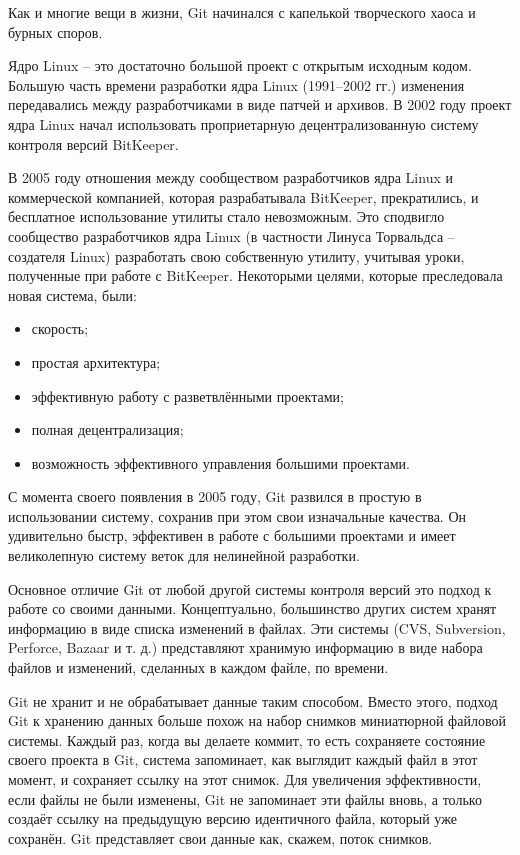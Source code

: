 Как и многие вещи в жизни, Git начинался с капелькой творческого хаоса и бурных споров.

Ядро Linux -- это достаточно большой проект с открытым исходным кодом. Большую часть времени разработки ядра Linux (1991–2002 гг.) изменения передавались между разработчиками в виде патчей и архивов. В 2002 году проект ядра Linux начал использовать проприетарную децентрализованную систему контроля версий BitKeeper.

В 2005 году отношения между сообществом разработчиков ядра Linux и коммерческой компанией, которая разрабатывала BitKeeper, прекратились, и бесплатное использование утилиты стало невозможным. Это сподвигло сообщество разработчиков ядра Linux (в частности Линуса Торвальдса -- создателя Linux) разработать свою собственную утилиту, учитывая уроки, полученные при работе с BitKeeper. Некоторыми целями, которые преследовала новая система, были:
\begin{itemize}
	\item скорость;
	\item простая архитектура;
	\item эффективную работу с разветвлёнными проектами;
	\item полная децентрализация;
	\item возможность эффективного управления большими проектами.
\end{itemize}

С момента своего появления в 2005 году, Git развился в простую в использовании систему, сохранив при этом свои изначальные качества. Он удивительно быстр, эффективен в работе с большими проектами и имеет великолепную систему веток для нелинейной разработки.

Основное отличие Git от любой другой системы контроля версий это подход к работе со своими данными. Концептуально, большинство других
систем хранят информацию в виде списка изменений в файлах. Эти системы (CVS,
Subversion, Perforce, Bazaar и т. д.) представляют хранимую информацию в виде набора файлов и изменений, сделанных в каждом файле, по времени.

Git не хранит и не обрабатывает данные таким способом. Вместо этого, подход Git к хранению данных больше похож на набор снимков миниатюрной файловой системы. Каждый раз, когда вы делаете коммит, то есть сохраняете состояние своего проекта в Git, система запоминает, как выглядит каждый файл в этот момент, и сохраняет ссылку на этот снимок. Для увеличения эффективности, если файлы не были изменены, Git не запоминает эти файлы вновь, а только создаёт ссылку на предыдущую версию идентичного файла, который уже сохранён. Git представляет свои данные как, скажем, поток снимков.


